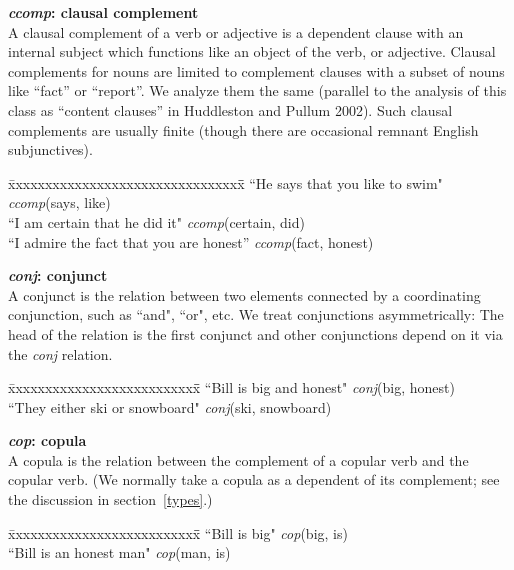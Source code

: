 \documentclass[11pt,letter]{article}
\begin{document}
\noindent\textbf{\emph{ccomp}: clausal complement}\\
A clausal complement of a verb or adjective is a dependent clause with an internal subject which functions like an object of the verb, or adjective.  Clausal complements for nouns are limited to complement clauses with a subset of nouns
 like ``fact'' or ``report''.  We analyze them the same (parallel to the
 analysis of this class as ``content clauses'' in Huddleston and Pullum 2002). Such clausal complements are usually finite (though there are occasional remnant English subjunctives).
\begin{tabbing}
\hspace{1cm} \= xxxxxxxxxxxxxxxxxxxxxxxxxxxxxxxx\= \hspace{.5cm}\=  \kill
\>  ``He says that you like to swim" \> \> \emph{ccomp}(says, like)\\
\hspace{1cm} \> ``I am certain that he did it" \> \>  \emph{ccomp}(certain, did)\\
\hspace{1cm} \> ``I admire the fact that you are honest'' \>\> \emph{ccomp}(fact, honest)\\
\end{tabbing}

\noindent\textbf{\emph{conj}: conjunct}\\
A conjunct is the relation between two elements connected by a coordinating conjunction, such as ``and", ``or", etc.  We treat conjunctions asymmetrically: The head of the relation is the first conjunct and other conjunctions depend on it via the \emph{conj} relation.
\begin{tabbing}
\hspace{1cm} \= xxxxxxxxxxxxxxxxxxxxxxxxxx\= \hspace{.5cm}\=  \kill
\>  ``Bill is big and honest" \> \> \emph{conj}(big, honest)\\
\hspace{1cm} \> ``They either ski or snowboard" \> \>  \emph{conj}(ski, snowboard)\\
\end{tabbing}

\noindent\textbf{\emph{cop}: copula}\\
A copula is the relation between the complement of a copular verb and the copular verb.  (We normally take a copula as a dependent of its complement; see the discussion in section~\ref{types}.)
\begin{tabbing}
\hspace{1cm} \= xxxxxxxxxxxxxxxxxxxxxxxxxx\= \hspace{.5cm}\=  \kill
\> ``Bill is big" \hspace{1cm} \> \> \emph{cop}(big, is)\\
\hspace{1cm} \> ``Bill is an honest man" \>  \> \emph{cop}(man, is)\\
\end{tabbing}
\end{document}
